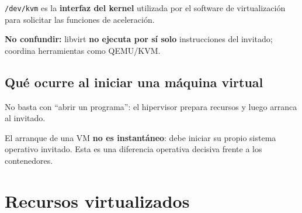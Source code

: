\documentclass[11pt,a4paper]{article}
\newcommand{\cmd}[1]{\texttt{#1}}
\begin{document}
\begin{defbox}
\cmd{/dev/kvm} es la \textbf{interfaz del kernel} utilizada por el software de virtualización
para solicitar las funciones de aceleración.
\end{defbox}

\begin{errorbox}
\textbf{No confundir:} libvirt \textbf{no ejecuta por sí solo} instrucciones del invitado;
coordina herramientas como QEMU/KVM.
\end{errorbox}

\subsection{Qué ocurre al iniciar una máquina virtual}

No basta con \textquotedblleft abrir un programa\textquotedblright: el hipervisor prepara recursos y luego
arranca al invitado.

\begin{center}
\end{center}

\begin{aviso}
El arranque de una VM \textbf{no es instantáneo}: debe iniciar su propio sistema operativo
invitado. Esta es una diferencia operativa decisiva frente a los contenedores.
\end{aviso}

\section{Recursos virtualizados}
\end{document}
